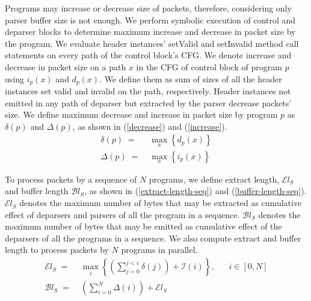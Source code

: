 \documentclass{hotnets19}
\begin{document}
Programs may increase or decrease size of packets, therefore, considering only parser buffer size is not enough.
We perform symbolic execution of control and deparser blocks to determine maximum increase and decrease in packet size by the program.
We evaluate header instances' setValid and setInvalid method call statements on every path of the control block's CFG.
We denote increase and decrease in packet size on a path $x$ in the CFG of control block of program $p$ using $i_{p}(x)$ and $d_{p}(x)$.
We define them as sum of sizes of all the header instances set valid and invalid on the path, respectively.
Header instances not emitted in any path of deparser but extracted by the parser decrease packets' size. 
We define maximum decrease and increase in packet size by program $p$ as $\delta(p)$ and $\Delta(p)$, as shown in (\ref{decrease}) and (\ref{increase}).
\begin{align}
\delta(p)\; =& \;  \max_{x} \left\{ d_{p}(x) \right\} \label{decrease} \\
\Delta(p) \; =& \; \max_{x} \left\{ i_{p}(x) \right\} \label{increase}
\end{align}

To process packets by a sequence of $N$ programs, we define extract length, $\mathcal{E}l_{S}$ and buffer length $\mathcal{B}l_{S}$, as shown in (\ref{extract-length-seq}) and (\ref{buffer-length-seq}).
$\mathcal{E}l_{S}$ denotes the maximum number of bytes that may be extracted as cumulative effect of deparsers and parsers of all the program in a sequence.
$\mathcal{B}l_{S}$ denotes the maximum number of bytes that may be emitted as cumulative effect of the deparsers of all the programs in a sequence.
We also compute extract and buffer length to process packets by $N$ programs in parallel.
\begin{align}
\mathcal{E}l_{S} \; =& \; \max_{i} \left\{ \left( \sum_{j=0}^{j<i} \delta(j) \right)+ \mathcal{I}(i) \right\},&\;\;\;i  \in [0,N] \label{extract-length-seq} \\
\mathcal{B}l_{S} \; =& \; \left( \sum_{i=0}^{N} \Delta(i) \right)+ \mathcal{E}l_{S} & \label{buffer-length-seq}
\end{align}
\end{document}
